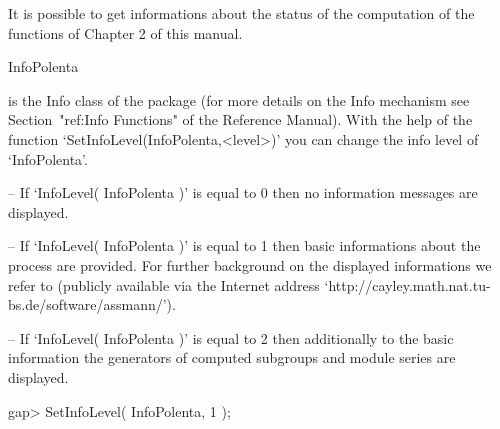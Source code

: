 
It is possible to get informations about the status of the computation of the 
functions of Chapter 2 of this manual.


\> InfoPolenta
 
is the Info class of the {\Polenta} package (for more details on the Info mechanism see Section~"ref:Info Functions" of the 
{\GAP} Reference Manual). 
With the help of the function 
`SetInfoLevel(InfoPolenta,<level>)' you can change 
the info level of `InfoPolenta'. 
\beginlist
\item{--}
  If  `InfoLevel( InfoPolenta )' is equal to 0 
 then no information 
  messages are displayed. 
\item{--}
  If `InfoLevel( InfoPolenta )' is equal to 1 then basic informations
  about the process are provided. For further background on the displayed 
  informations we refer to  \cite{Assmann} (publicly available via the 
  Internet address `http://cayley.math.nat.tu-bs.de/software/assmann/').
\item{--}
  If `InfoLevel( InfoPolenta )' is equal to 2 then additionally to the 
  basic information the generators of computed subgroups and module series
  are displayed. 
\endlist



\beginexample
gap> SetInfoLevel( InfoPolenta, 1 );

